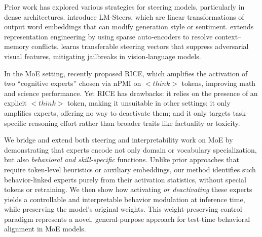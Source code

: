 \documentclass{article} %
\begin{document}
Prior work has explored various strategies for steering models, particularly in dense architectures. \citet{han-etal-2024-word} introduce LM-Steers, which are linear transformations of output word embeddings that can modify generation style or sentiment. \citet{zhao-etal-2025-steering} extends representation engineering by using sparse auto‑encoders to resolve context–memory conflicts. \citet{wang2025steering} learns transferable steering vectors that suppress adversarial visual features, mitigating jailbreaks in vision‑language models.

In the MoE setting, \citet{wang2025expertsneedsteeringthinking} recently proposed RICE, which amplifies the activation of two ``cognitive experts'' chosen via nPMI on $<\!think\!>$ tokens, improving math and science performance.
Yet RICE has drawbacks: it relies on the presence of an explicit $<\!think\!>$ token, making it unsuitable in other settings; it only amplifies experts, offering no way to deactivate them; and it only targets task-specific reasoning effort rather than broader traits like factuality or toxicity.




We bridge and extend both steering and interpretability work on MoE by demonstrating that experts encode not only domain or vocabulary specialization, but also \emph{behavioral and skill-specific} functions. Unlike prior approaches that require token-level heuristics or auxiliary embeddings, our method identifies such behavior-linked experts purely from their activation statistics, without special tokens or retraining. We then show how activating \emph{or deactivating} these experts yields a controllable and interpretable behavior modulation at inference time, while preserving the model’s original weights. This weight-preserving control paradigm represents a novel, general-purpose approach for test-time behavioral alignment in MoE models.
\end{document}
